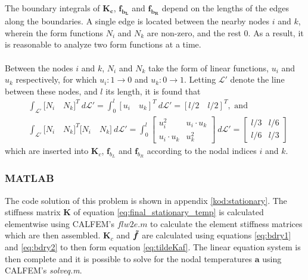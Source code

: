 \documentclass[a4paper,11pt]{article}
\begin{document}
\medskip \noindent The boundary integrals of $\boldsymbol{K_c}$, $\boldsymbol{f_{b_L}}$ and $\boldsymbol{f_{b_R}}$ depend on the lengths of the edges along the boundaries. A single edge is located between the nearby nodes $i$ and $k$, wherein the form functions $N_i$ and $N_k$ are non-zero, and the rest 0. As a result, it is reasonable to analyze two form functions at a time.\\
\\Between the nodes $i$ and $k$, $N_i$ and $N_k$ take the form of linear functions, $u_i$ and $u_k$ respectively, for which $u_i: 1 \rightarrow 0$ and $u_k: 0 \rightarrow 1$. Letting $\mathcal{L'}$ denote the line between these nodes, and $l$ its length, it is found that
\begin{align}
    &\int_{\mathcal{L'}} \boldsymbol [N_i \quad N_k]^T \: d\mathcal{L'} = \int_0^l [u_i \quad u_{k}]^T \: d\mathcal{L'} = [l/2 \quad l/2]^T, \text{ and}
    \label{eq:bdry1}\\
    &\int_{\mathcal{L'}} \boldsymbol [N_i \quad N_k]^T \boldsymbol [N_i \quad N_k] \: d \mathcal{L'} = \int_0^l \begin{bmatrix}
    u_i^2 & u_i \cdot u_k\\
    u_i \cdot u_k & u_k^2
    \end{bmatrix} \: d\mathcal{L'} = \begin{bmatrix}l/3&l/6\\l/6&l/3\end{bmatrix}
    \label{eq:bdry2}
\end{align}
which are inserted into $\boldsymbol{K}_c$, $\boldsymbol{f}_{b_L}$ and $\boldsymbol{f}_{b_R}$ according to the nodal indices $i$ and $k$.

\subsubsection{MATLAB}
The code solution of this problem is shown in appendix \ref{kod:stationary}. The stiffness matrix $\boldsymbol K$ of equation \ref{eq:final_stationary_temp} is calculated elementwise using CALFEM's $flw2e.m$ to calculate the element stiffness matrices which are then assembled. $\boldsymbol{K}_c$ and $\boldsymbol{\Tilde{f}}$ are calculated using equations \ref{eq:bdry1} and \ref{eq:bdry2} to then form equation \ref{eq:tildeKaf}. The linear equation system is then complete and it is possible to solve for the nodal temperatures $\boldsymbol a$ using CALFEM's \textit{solveq.m}.
\end{document}
